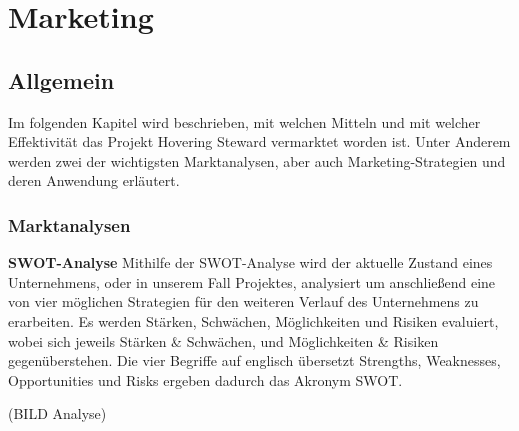 \chapter{Marketing}
\renewcommand{\kapitelautor}{Autor: Markus Kaiser}

\section{Allgemein}
Im folgenden Kapitel wird beschrieben, mit welchen Mitteln und mit welcher Effektivität
das Projekt Hovering Steward vermarktet worden ist. Unter Anderem werden zwei der wichtigsten Marktanalysen,
aber auch Marketing-Strategien und deren Anwendung erläutert.

  \subsection{Marktanalysen}
  \textbf{SWOT-Analyse}
  Mithilfe der SWOT-Analyse wird der aktuelle Zustand eines Unternehmens, oder in unserem Fall Projektes, analysiert um anschließend eine von vier möglichen Strategien
  für den weiteren Verlauf des Unternehmens zu erarbeiten. Es werden Stärken, Schwächen, Möglichkeiten und Risiken evaluiert, wobei sich jeweils Stärken \& Schwächen, und
  Möglichkeiten \& Risiken gegenüberstehen. Die vier Begriffe auf englisch übersetzt Strengths, Weaknesses, Opportunities und Risks ergeben dadurch das Akronym SWOT.

  (BILD Analyse)

